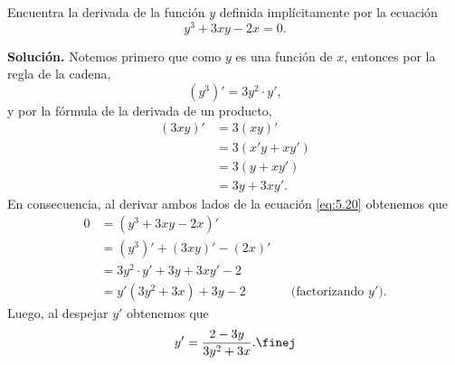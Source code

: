 \documentclass[12pt,a4paper]{book}
\begin{document}
    \begin{ejemplo}\label{ejm:87}
        Encuentra la derivada de la función
        $y$ definida implícitamente por la ecuación
        \begin{equation}\label{eq:5.20}
            y^{3}+3xy-2x=0.
        \end{equation}

        \textbf{Solución.} Notemos primero que como $y$ es una función de $x$, entonces por
        la regla de la cadena,
        \begin{equation*}
            \left(y^{3}\right)'=3y^{2}\cdot y',
        \end{equation*}
        y por la fórmula de la derivada de un producto,
        \begin{align*}
            (3xy)'&=3(xy)'\\
            &=3(x'y+xy')\\
            &=3(y+xy')\\
            &=3y+3xy'.
        \end{align*}
        En consecuencia, al derivar ambos lados de la ecuación \eqref{eq:5.20} obtenemos que
        \begin{align*}
            0&=\left(y^{3}+3xy-2x\right)'\\
            &=\left(y^{3}\right)'+(3xy)'-(2x)'\\
            &=3y^{2}\cdot y'+3y+3xy'-2\\
            &=y'\left(3y^{2}+3x\right)+3y-2 &&\text{(factorizando $y'$)}.
        \end{align*}
        Luego, al despejar $y'$ obtenemos que
        \begin{equation*}
            y'=\frac{2-3y}{3y^{2}+3x}.\finej
        \end{equation*}
    \end{ejemplo}
\end{document}
